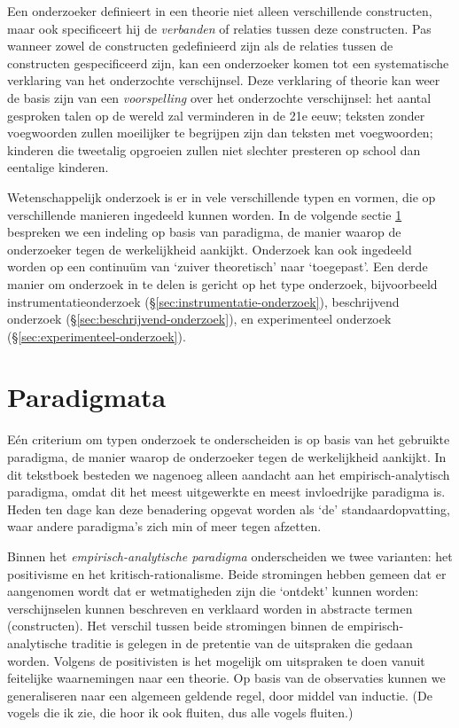 \documentclass[
]{book}
\begin{document}
Een onderzoeker definieert in een theorie niet alleen verschillende
constructen, maar ook specificeert hij de \emph{verbanden} of relaties tussen
deze constructen. Pas wanneer zowel de constructen gedefinieerd zijn als
de relaties tussen de constructen gespecificeerd zijn, kan een
onderzoeker komen tot een systematische verklaring van het onderzochte
verschijnsel. Deze verklaring of theorie kan weer de basis zijn van een
\emph{voorspelling} over het onderzochte verschijnsel: het aantal gesproken
talen op de wereld zal verminderen in de 21e eeuw; teksten zonder
voegwoorden zullen moeilijker te begrijpen zijn dan teksten met
voegwoorden; kinderen die tweetalig opgroeien zullen niet slechter
presteren op school dan eentalige kinderen.

Wetenschappelijk onderzoek is er in vele verschillende typen en vormen,
die op verschillende manieren ingedeeld kunnen worden. In de volgende sectie \ref{sec:paradigmata} bespreken we een indeling op basis van
paradigma, de manier waarop de onderzoeker tegen de werkelijkheid
aankijkt. Onderzoek kan ook ingedeeld worden op een continuüm van
`zuiver theoretisch' naar `toegepast'. Een derde manier om onderzoek in
te delen is gericht op het type onderzoek, bijvoorbeeld
instrumentatieonderzoek (§\ref{sec:instrumentatie-onderzoek}), beschrijvend onderzoek (§\ref{sec:beschrijvend-onderzoek}),
en experimenteel onderzoek (§\ref{sec:experimenteel-onderzoek}).

\hypertarget{sec:paradigmata}{%
\section{Paradigmata}\label{sec:paradigmata}}

Eén criterium om typen onderzoek te onderscheiden is op basis van het
gebruikte paradigma, de manier waarop de onderzoeker tegen de
werkelijkheid aankijkt. In dit tekstboek besteden we nagenoeg alleen
aandacht aan het empirisch-analytisch paradigma, omdat dit het meest
uitgewerkte en meest invloedrijke paradigma is. Heden ten dage kan deze
benadering opgevat worden als `de' standaardopvatting, waar andere
paradigma's zich min of meer tegen afzetten.

Binnen het \emph{empirisch-analytische paradigma} onderscheiden we twee
varianten: het positivisme en het kritisch-rationalisme. Beide
stromingen hebben gemeen dat er aangenomen wordt dat er wetmatigheden
zijn die `ontdekt' kunnen worden: verschijnselen kunnen beschreven en
verklaard worden in abstracte termen (constructen). Het verschil tussen
beide stromingen binnen de empirisch-analytische traditie is gelegen in
de pretentie van de uitspraken die gedaan worden. Volgens de
positivisten is het mogelijk om uitspraken te doen vanuit feitelijke
waarnemingen naar een theorie. Op basis van de observaties kunnen we
generaliseren naar een algemeen geldende regel, door middel van
inductie. (De vogels die ik zie, die hoor ik ook fluiten, dus alle
vogels fluiten.)
\end{document}
